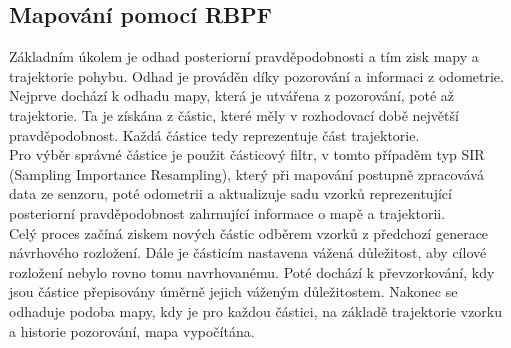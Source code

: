 \documentclass[11pt]{article}
\begin{document}
\subsection{Mapování pomocí RBPF}
Základním úkolem je odhad posteriorní pravděpodobnosti a tím zisk mapy a trajektorie pohybu. Odhad je prováděn díky pozorování a informaci z odometrie. Nejprve dochází k odhadu mapy, která je utvářena z pozorování, poté až trajektorie. Ta je získána z částic, které měly v rozhodovací době největší pravděpodobnost. Každá částice tedy reprezentuje část trajektorie.\\
\indent Pro výběr správné částice je použit částicový filtr, v tomto případěm typ SIR (Sampling Importance Resampling), který při mapování postupně zpracovává data ze senzoru, poté odometrii a aktualizuje sadu vzorků reprezentující posteriorní pravděpodobnost zahrnující informace o mapě a trajektorii. \\
\indent Celý proces začíná ziskem nových částic odběrem vzorků z předchozí generace návrhového rozložení. Dále je částicím nastavena vážená důležitost, aby cílové rozložení nebylo rovno tomu navrhovanému. Poté dochází k převzorkování, kdy jsou částice přepisovány úměrně jejich váženým důležitostem. Nakonec se odhaduje podoba mapy, kdy je pro každou částici, na základě trajektorie vzorku a historie pozorování, mapa vypočítána.
\end{document}
